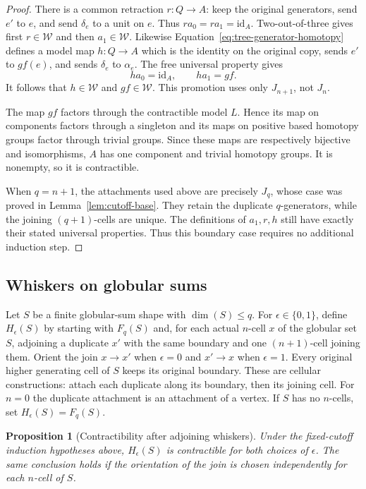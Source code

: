 \documentclass[11pt,letterpaper]{article}
\numberwithin{equation}{section}
\theoremstyle{plain}
\newtheorem{proposition}[theorem]{Proposition}
\theoremstyle{definition}
\theoremstyle{remark}
\newcommand{\id}{\mathrm{id}}
\begin{document}
\begin{proof}
There is a common retraction $r:Q\to A$: keep the original
generators, send $e'$ to $e$, and send $\delta_e$ to a unit on
$e$.  Thus $ra_0=ra_1=\id_A$.  Two-out-of-three gives first
$r\in\mathcal W$ and then $a_1\in\mathcal W$.
Likewise Equation~\eqref{eq:tree-generator-homotopy} defines a
model map $h:Q\to A$ which is the identity on the original copy,
sends $e'$ to $gf(e)$, and sends $\delta_e$ to $\alpha_e$.
The free universal property gives
\[
 ha_0=\id_A,\qquad ha_1=gf.
\]
It follows that $h\in\mathcal W$ and $gf\in\mathcal W$.
This promotion uses only $J_{n+1}$, not $J_n$.

The map $gf$ factors through the contractible model $L$.  Hence
its map on components factors through a singleton and its maps
on positive based homotopy groups factor through trivial groups.
Since these maps are respectively bijective and isomorphisms,
$A$ has one component and trivial homotopy groups.  It is
nonempty, so it is contractible.

When $q=n+1$, the attachments used above are precisely $J_q$,
whose case was proved in Lemma~\ref{lem:cutoff-base}.  They retain
the duplicate $q$-generators, while the joining $(q+1)$-cells
are unique.  The definitions of $a_1,r,h$ still have exactly
their stated universal properties.  Thus this boundary case
requires no additional induction step.
\end{proof}

\subsection{Whiskers on globular sums}

Let $S$ be a finite globular-sum shape with $\dim(S)\leq q$.
For $\epsilon\in\{0,1\}$, define $H_\epsilon(S)$ by starting
with $F_q(S)$ and, for each actual $n$-cell $x$ of the globular
set $S$, adjoining a duplicate $x'$ with the same boundary and
one $(n+1)$-cell joining them.  Orient the join $x\to x'$ when
$\epsilon=0$ and $x'\to x$ when $\epsilon=1$.  Every original
higher generating cell of $S$ keeps its original boundary.
These are cellular constructions: attach each duplicate along
its boundary, then its joining cell.  For $n=0$ the duplicate
attachment is an attachment of a vertex.  If $S$ has no
$n$-cells, set $H_\epsilon(S)=F_q(S)$.

\begin{proposition}[Contractibility after adjoining whiskers]
\label{prop:whiskered-shape}
Under the fixed-cutoff induction hypotheses above,
$H_\epsilon(S)$ is contractible for both choices of $\epsilon$.
The same conclusion holds if the orientation of the join is
chosen independently for each $n$-cell of $S$.
\end{proposition}
\end{document}
